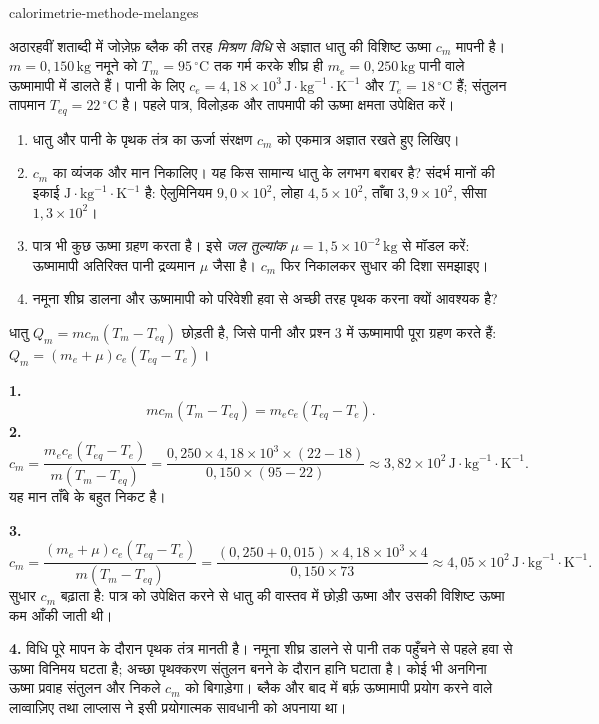\begin{exo}[मिश्रण विधि से धातु की विशिष्ट ऊष्मा का निर्धारण]{calorimetrie-methode-melanges}

अठारहवीं शताब्दी में जोज़ेफ़ ब्लैक की तरह \emph{मिश्रण विधि} से अज्ञात धातु की विशिष्ट ऊष्मा $c_m$ मापनी है। $m=0{,}150\,\text{kg}$ नमूने को $T_m=95\,^\circ\text{C}$ तक गर्म करके शीघ्र ही $m_e=0{,}250\,\text{kg}$ पानी वाले ऊष्मामापी में डालते हैं। पानी के लिए $c_e=4{,}18\times10^3\,\text{J}\!\cdot\!\text{kg}^{-1}\!\cdot\!\text{K}^{-1}$ और $T_e=18\,^\circ\text{C}$ हैं; संतुलन तापमान $T_{eq}=22\,^\circ\text{C}$ है। पहले पात्र, विलोड़क और तापमापी की ऊष्मा क्षमता उपेक्षित करें।
\begin{enumerate}
  \item धातु और पानी के पृथक तंत्र का ऊर्जा संरक्षण $c_m$ को एकमात्र अज्ञात रखते हुए लिखिए।
  \item $c_m$ का व्यंजक और मान निकालिए। यह किस सामान्य धातु के लगभग बराबर है? संदर्भ मानों की इकाई $\text{J}\!\cdot\!\text{kg}^{-1}\!\cdot\!\text{K}^{-1}$ है: ऐलुमिनियम $9{,}0\times10^2$, लोहा $4{,}5\times10^2$, ताँबा $3{,}9\times10^2$, सीसा $1{,}3\times10^2$।
  \item पात्र भी कुछ ऊष्मा ग्रहण करता है। इसे \emph{जल तुल्यांक} $\mu=1{,}5\times10^{-2}\,\text{kg}$ से मॉडल करें: ऊष्मामापी अतिरिक्त पानी द्रव्यमान $\mu$ जैसा है। $c_m$ फिर निकालकर सुधार की दिशा समझाइए।
  \item नमूना शीघ्र डालना और ऊष्मामापी को परिवेशी हवा से अच्छी तरह पृथक करना क्यों आवश्यक है?
\end{enumerate}
\begin{indication}
धातु $Q_m=mc_m(T_m-T_{eq})$ छोड़ती है, जिसे पानी और प्रश्न 3 में ऊष्मामापी पूरा ग्रहण करते हैं: $Q_m=(m_e+\mu)c_e(T_{eq}-T_e)$।
\end{indication}
\begin{solution}
\textbf{1.}
\[
mc_m(T_m-T_{eq})=m_ec_e(T_{eq}-T_e).
\]
\textbf{2.}
\[
c_m=\frac{m_ec_e(T_{eq}-T_e)}{m(T_m-T_{eq})}
=\frac{0{,}250\times4{,}18\times10^3\times(22-18)}{0{,}150\times(95-22)}
\approx3{,}82\times10^2\,\text{J}\!\cdot\!\text{kg}^{-1}\!\cdot\!\text{K}^{-1}.
\]
यह मान ताँबे के बहुत निकट है।

\textbf{3.}
\[
c_m=\frac{(m_e+\mu)c_e(T_{eq}-T_e)}{m(T_m-T_{eq})}
=\frac{(0{,}250+0{,}015)\times4{,}18\times10^3\times4}{0{,}150\times73}
\approx4{,}05\times10^2\,\text{J}\!\cdot\!\text{kg}^{-1}\!\cdot\!\text{K}^{-1}.
\]
सुधार $c_m$ बढ़ाता है: पात्र को उपेक्षित करने से धातु की वास्तव में छोड़ी ऊष्मा और उसकी विशिष्ट ऊष्मा कम आँकी जाती थी।

\textbf{4.} विधि पूरे मापन के दौरान पृथक तंत्र मानती है। नमूना शीघ्र डालने से पानी तक पहुँचने से पहले हवा से ऊष्मा विनिमय घटता है; अच्छा पृथक्करण संतुलन बनने के दौरान हानि घटाता है। कोई भी अनगिना ऊष्मा प्रवाह संतुलन और निकले $c_m$ को बिगाड़ेगा। ब्लैक और बाद में बर्फ़ ऊष्मामापी प्रयोग करने वाले लाव्वाज़िए तथा लाप्लास ने इसी प्रयोगात्मक सावधानी को अपनाया था।
\end{solution}
\end{exo}

